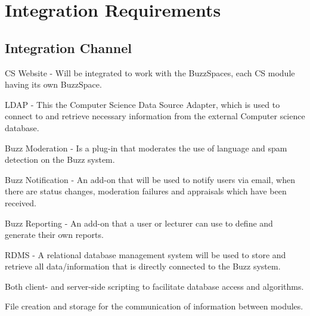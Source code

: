 \documentclass[a4paper,12pt]{report}
\begin{document}

	
\section{Integration Requirements}
\subsection{Integration Channel}
\begin{description}
\item CS Website - Will be integrated to work with the BuzzSpaces, each CS module having its own BuzzSpace.
\item LDAP - This the Computer Science Data Source Adapter, which is used to connect to and retrieve necessary information from the external Computer science database. 
\item Buzz Moderation - Is a plug-in that moderates the use of language and spam detection on the Buzz system.
\item Buzz Notification - An add-on that will be used to notify users via email, when there are status changes,
	moderation failures and appraisals which have been received.
\item Buzz Reporting - An add-on that a user or lecturer can use to define and generate their own reports.
\item RDMS - A relational database management system will be used to store and retrieve all data/information that is directly connected to the Buzz system. 
\item Both client- and server-side scripting to facilitate database access and algorithms.
\item File creation and storage for the communication of information between modules.
\end{description}
\end{document}
